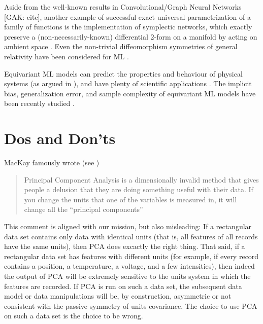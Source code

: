 \documentclass{article}
\theoremstyle{plain}
\theoremstyle{definition}
\theoremstyle{remark}
\begin{document}
Aside from the well-known results in Convolutional/Graph Neural Networks [GAK: cite], another example of successful exact universal parametrization of a family of functions is the implementation of symplectic networks, which exactly preserve a (non-necessarily-known) differential 2-form on a manifold by acting on ambient space \cite{sympnets,henonnets}. Even the non-trivial diffeomorphism symmetries of general relativity have been considered for ML \cite{weiler}.
 
Equivariant ML models can predict the properties and behaviour of physical systems (as argued in \citealt{cheng2019covariance}), and have plenty of scientific applications \cite{batzner20223, musaelian2022learning, stark2022equibind, yu-physics, wang2022approximately}. The implicit bias, generalization error, and sample complexity of equivariant ML models have been recently studied \cite{lawrence2021implicit, bietti2021sample, elesedy2021provably, elesedy2021kernel, mei2021learning}.

\section{Dos and Don'ts}\label{sec:dos}

MacKay famously wrote (see \citealt{muldoonmedium})
\vspace{-2ex}\begin{quote}Principal Component Analysis is a dimensionally invalid method that gives people a delusion that they are doing something useful with their data. If you change the units that one of the variables is measured in, it will change all the ``principal components''\end{quote}\vspace{-2ex}
This comment is aligned with our mission, but also misleading: If a rectangular data set contains only data with identical units (that is, all features of all records have the same units), then PCA does excactly the right thing.
That said, if a rectangular data set has features with different units (for example, if every record contains a position, a temperature, a voltage, and a few intensities), then indeed the output of PCA will be extremely sensitive to the units system in which the features are recorded.
If PCA is run on such a data set, the subsequent data model or data manipulations will be, by construction, asymmetric or not consistent with the passive symmetry of units covariance.
The choice to use PCA on such a data set is the choice to be wrong.
\end{document}
